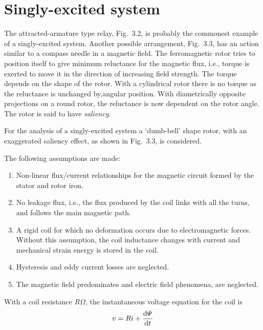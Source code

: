 \documentclass[a4paper,numbers=noenddot,12pt]{scrbook}
\begin{document}
            \section{Singly-excited system} 
            The attracted-armature type relay, Fig.\ 3.2, is probably the commonest example of a singly-excited system. Another possible arrangement, Fig.\ 3.3, has an action similar to a compass needle in a magnetic field. The ferromagnetic rotor tries to position itself to give minimum reluctance for the magnetic flux, i.e., torque is exerted to move it in the direction of increasing field strength. The torque depends on the shape of the rotor. With a cylindrical rotor there is no torque as the reluctance
            is unchanged by,angular position. With diametrically opposite projections on a round rotor, the reluctance is now dependent on the rotor angle. The rotor is said to have 
            \textit{saliency}.

            For the analysis of a singly-excited system a `dumb-bell' shape rotor, with an exaggerated saliency effect, as shown in Fig.\ 3.3, is considered. 

            The following assumptions are made:
            \begin{enumerate}
                \item Non-linear flux/current relationships for the magnetic circuit formed by the stator and rotor iron.
                \item No leakage flux, i.e., the flux produced by the coil links with all the turns, and follows the main magnetic path.
                \item A rigid coil for which no deformation occurs due to electromagnetic forces. Without this assumption, the coil inductance changes with current and mechanical strain energy is stored in the coil.
                \item Hysteresis and eddy current losses are neglected.
                \item The magnetic field predominates and electric field phenomena, are neglected. 
            \end{enumerate}

            With a coil resistance $R \Omega$, the instantaneous voltage equation for the coil is
            \begin{equation}
                v = Ri + \dfrac{\dif \varPsi}{\dif t}
                \label{eq:Eq3.7}
            \end{equation}
\end{document}
